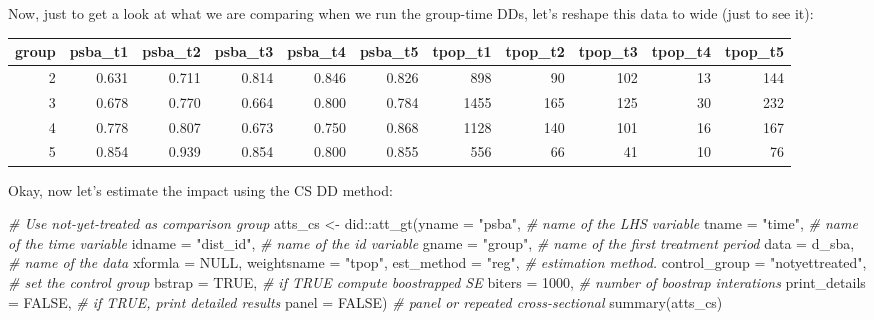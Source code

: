 \documentclass[
]{article}
\newenvironment{Shaded}{\begin{snugshade}}{\end{snugshade}}
\newcommand{\AttributeTok}[1]{\textcolor[rgb]{0.77,0.63,0.00}{#1}}
\newcommand{\CommentTok}[1]{\textcolor[rgb]{0.56,0.35,0.01}{\textit{#1}}}
\newcommand{\ConstantTok}[1]{\textcolor[rgb]{0.00,0.00,0.00}{#1}}
\newcommand{\DecValTok}[1]{\textcolor[rgb]{0.00,0.00,0.81}{#1}}
\newcommand{\FunctionTok}[1]{\textcolor[rgb]{0.00,0.00,0.00}{#1}}
\newcommand{\NormalTok}[1]{#1}
\newcommand{\OtherTok}[1]{\textcolor[rgb]{0.56,0.35,0.01}{#1}}
\newcommand{\SpecialCharTok}[1]{\textcolor[rgb]{0.00,0.00,0.00}{#1}}
\newcommand{\StringTok}[1]{\textcolor[rgb]{0.31,0.60,0.02}{#1}}
\begin{document}
Now, just to get a look at what we are comparing when we run the
group-time DDs, let's reshape this data to wide (just to see it):

\begin{table}
\centering
\begin{tabular}[t]{r|r|r|r|r|r|r|r|r|r|r}
\hline
group & psba_t1 & psba_t2 & psba_t3 & psba_t4 & psba_t5 & tpop_t1 & tpop_t2 & tpop_t3 & tpop_t4 & tpop_t5\\
\hline
2 & 0.631 & 0.711 & 0.814 & 0.846 & 0.826 & 898 & 90 & 102 & 13 & 144\\
\hline
3 & 0.678 & 0.770 & 0.664 & 0.800 & 0.784 & 1455 & 165 & 125 & 30 & 232\\
\hline
4 & 0.778 & 0.807 & 0.673 & 0.750 & 0.868 & 1128 & 140 & 101 & 16 & 167\\
\hline
5 & 0.854 & 0.939 & 0.854 & 0.800 & 0.855 & 556 & 66 & 41 & 10 & 76\\
\hline
\end{tabular}
\end{table}

Okay, now let's estimate the impact using the CS DD method:

\begin{Shaded}
\begin{Highlighting}[]
\CommentTok{\# Use not{-}yet{-}treated as comparison group}
\NormalTok{atts\_cs }\OtherTok{\textless{}{-}}\NormalTok{ did}\SpecialCharTok{::}\FunctionTok{att\_gt}\NormalTok{(}\AttributeTok{yname =} \StringTok{"psba"}\NormalTok{, }\CommentTok{\# name of the LHS variable}
                       \AttributeTok{tname =} \StringTok{"time"}\NormalTok{, }\CommentTok{\# name of the time variable}
                       \AttributeTok{idname =} \StringTok{"dist\_id"}\NormalTok{, }\CommentTok{\# name of the id variable}
                       \AttributeTok{gname =} \StringTok{"group"}\NormalTok{, }\CommentTok{\# name of the first treatment period}
                       \AttributeTok{data =}\NormalTok{ d\_sba, }\CommentTok{\# name of the data}
                       \AttributeTok{xformla =} \ConstantTok{NULL}\NormalTok{,}
                       \AttributeTok{weightsname =} \StringTok{"tpop"}\NormalTok{,}
                       \AttributeTok{est\_method =} \StringTok{"reg"}\NormalTok{, }\CommentTok{\# estimation method.}
                       \AttributeTok{control\_group =} \StringTok{"notyettreated"}\NormalTok{, }\CommentTok{\# set the control group}
                       \AttributeTok{bstrap =} \ConstantTok{TRUE}\NormalTok{, }\CommentTok{\# if TRUE compute boostrapped SE}
                       \AttributeTok{biters =} \DecValTok{1000}\NormalTok{, }\CommentTok{\# number of boostrap interations}
                       \AttributeTok{print\_details =} \ConstantTok{FALSE}\NormalTok{, }\CommentTok{\# if TRUE, print detailed results}
                       \AttributeTok{panel =} \ConstantTok{FALSE}\NormalTok{) }\CommentTok{\# panel or repeated cross{-}sectional}
\FunctionTok{summary}\NormalTok{(atts\_cs)}
\end{Highlighting}
\end{Shaded}
\end{document}
